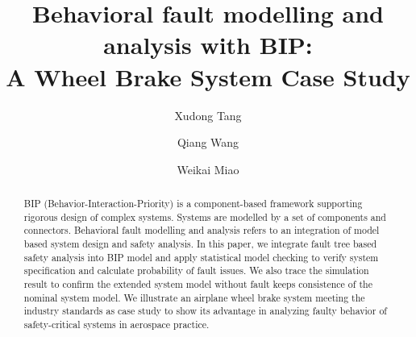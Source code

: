 \documentclass[runningheads]{llncs}
\begin{document}
%
\title{Behavioral fault modelling and analysis with BIP:\\
	A Wheel Brake System Case Study\\}
%
%
\author{Xudong Tang \and
Qiang Wang \and
Weikai Miao}
%
%
%
\maketitle              %
%
\begin{abstract}
BIP (Behavior-Interaction-Priority) is a component-based framework supporting rigorous design of complex systems.
Systems are modelled by a set of components and connectors.
Behavioral fault modelling and analysis refers to an integration of model based system design and safety analysis.
In this paper, we integrate fault tree based safety analysis into BIP model and
apply statistical model checking to verify system specification and calculate probability of fault issues.
We also trace the simulation result to confirm the extended system model without fault keeps consistence of the nominal system model.
We illustrate an airplane wheel brake system meeting the industry standards as case study
to show its advantage in analyzing faulty behavior of safety-critical systems in aerospace practice.

\end{abstract}
%
%
%







\end{document}
